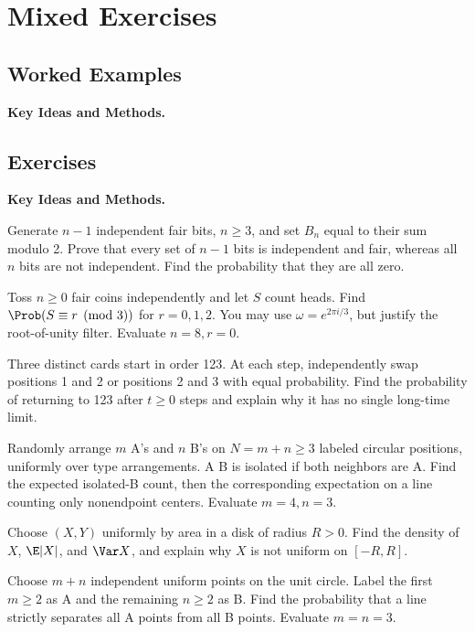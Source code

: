 \chapter{Mixed Exercises}
\section{Worked Examples}
\noindent\textbf{Key Ideas and Methods.}\enspace




\section{Exercises}
\noindent\textbf{Key Ideas and Methods.}\enspace



Generate $n-1$ independent fair bits, $n\ge3$, and set $B_n$ equal to their sum modulo 2. Prove that every set of $n-1$ bits is independent and fair, whereas all $n$ bits are not independent. Find the probability that they are all zero.

Toss $n\ge0$ fair coins independently and let $S$ count heads. Find $\Prob(S\equiv r\pmod3)$ for $r=0,1,2$. You may use $\omega=e^{2\pi i/3}$, but justify the root-of-unity filter. Evaluate $n=8,r=0$.

Three distinct cards start in order 123. At each step, independently swap positions 1 and 2 or positions 2 and 3 with equal probability. Find the probability of returning to 123 after $t\ge0$ steps and explain why it has no single long-time limit.

Randomly arrange $m$ A's and $n$ B's on $N=m+n\ge3$ labeled circular positions, uniformly over type arrangements. A B is isolated if both neighbors are A. Find the expected isolated-B count, then the corresponding expectation on a line counting only nonendpoint centers. Evaluate $m=4,n=3$.

Choose $(X,Y)$ uniformly by area in a disk of radius $R>0$. Find the density of $X$, $\E|X|$, and $\Var X$, and explain why $X$ is not uniform on $[-R,R]$.

Choose $m+n$ independent uniform points on the unit circle. Label the first $m\ge2$ as A and the remaining $n\ge2$ as B. Find the probability that a line strictly separates all A points from all B points. Evaluate $m=n=3$.


